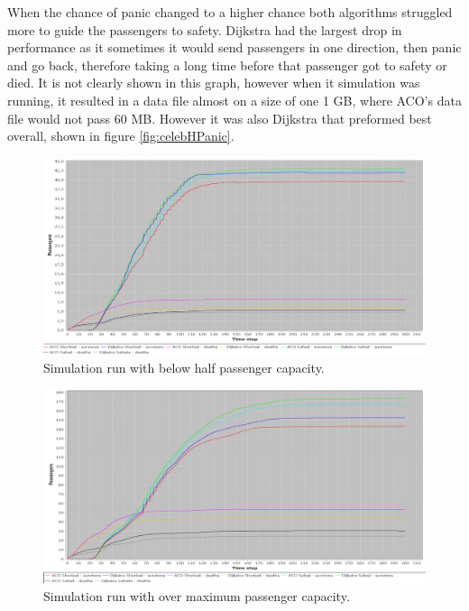 When the chance of panic changed to a higher chance both algorithms struggled more to guide the passengers to safety. Dijkstra had the largest drop in performance as it sometimes it would send passengers in one direction, then panic and go back, therefore taking a long time before that passenger got to safety or died. It is not clearly shown in this graph, however when it simulation was running, it resulted in a data file almost on a size of one 1 GB, where ACO's data file would not pass 60 MB. However it was also Dijkstra that preformed best overall, shown in figure \ref{fig:celebHPanic}.

\begin{figure} [h]
\centering
\hspace*{-1.0in}
\includegraphics[scale=0.35]{images/Graph-using-200-rounds-50-passangers.png}
\caption{Simulation run with below half passenger capacity.}
\label{fig:celeb50}
\end{figure}

\begin{figure} [h]
\centering
\hspace*{-1.0in}
\includegraphics[scale=0.35]{images/Graph-using-200-rounds-200-passangers.png}
\caption{Simulation run with over maximum passenger capacity.}
\label{fig:celeb200}
\end{figure}

